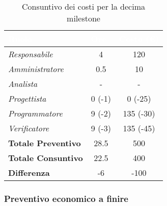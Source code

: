 \begin{table}[H]
    \renewcommand\arraystretch{1.5}
    \centering
    \begin{tabular}{|l|c|c|}
    \hline
    \rowcolor[HTML]{036400}
    \textcolor{white}{\textbf{Ruolo}} & \multicolumn{1}{l|}{\textcolor{white}{\textbf{Ore}}} & \multicolumn{1}{l|}{\textcolor{white}{\textbf{Costo (€)}}} \\ \hline
    \rowcolor[HTML]{EFEFEF}\textit{Responsabile}      & 4           & 120             \\ \hline
    \rowcolor[HTML]{C0C0C0}\textit{Amministratore}    & 0.5           & 10              \\ \hline
    \rowcolor[HTML]{EFEFEF}\textit{Analista}          & -           & -               \\ \hline
    \rowcolor[HTML]{C0C0C0}\textit{Progettista}       & 0 (-1)    & 0 (-25)     \\ \hline
    \rowcolor[HTML]{EFEFEF}\textit{Programmatore}     & 9 (-2)     & 135 (-30)       \\ \hline
    \rowcolor[HTML]{C0C0C0}\textit{Verificatore}      & 9 (-3) & 135 (-45)   \\ \hline
    \rowcolor[HTML]{EFEFEF}\textbf{Totale Preventivo} & 28.5        & 500          \\ \hline
    \rowcolor[HTML]{C0C0C0}\textbf{Totale Consuntivo} & 22.5          & 400            \\ \hline
    \rowcolor[HTML]{EFEFEF}\textbf{Differenza}        & -6        & -100            \\ \hline
    \end{tabular}
    \caption{Consuntivo dei costi per la decima milestone}
\end{table}

\subsubsection{Preventivo economico a finire}

